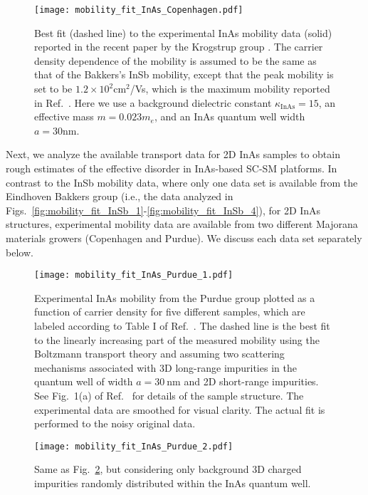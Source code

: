 \documentclass[aps,prmaterials,twocolumn,superscriptaddress,longbibliography]{revtex4-2}
\begin{document}
  \begin{figure}[!htb]
    \centering
    \texttt{[image: mobility\_fit\_InAs\_Copenhagen.pdf]}
    \caption{Best fit (dashed line) to the experimental InAs mobility data (solid) reported in the recent paper by the Krogstrup group \cite{beznasyuk2021role}. The carrier density dependence of the mobility is assumed to be the same as that of the Bakkers's InSb mobility, except that the peak mobility is set to be $1.2\times 10^2$cm$^2$/Vs, which is the maximum mobility reported in Ref.~. Here we use a background dielectric constant $\kappa_\mathrm{InAs}=15$, an effective mass $m=0.023m_e$, and an InAs quantum well width $a=30$nm.}
    \label{fig:mobility_fit_InAs_Copenhagen}
  \end{figure}  

Next, we analyze the available transport data for 2D InAs samples to obtain rough estimates of the effective disorder in  InAs-based  SC-SM platforms.  In contrast to the InSb mobility data, where only one data set is available from the Eindhoven Bakkers group (i.e., the data analyzed in Figs.~\ref{fig:mobility_fit_InSb_1}-\ref{fig:mobility_fit_InSb_4}), for 2D InAs structures, experimental mobility data are available from two different Majorana materials growers (Copenhagen and Purdue).  We discuss each data set separately below.
  
 \begin{figure*}[!htb]
    \centering
    \texttt{[image: mobility\_fit\_InAs\_Purdue\_1.pdf]}
    \caption{Experimental InAs mobility from the Purdue group \cite{pauka2020repairing} plotted as a function of carrier density for five different samples, which are labeled according to Table I of Ref.~. The dashed line is the best fit to the linearly increasing part of the measured mobility using the Boltzmann transport theory and assuming two scattering mechanisms associated with 3D long-range impurities in the quantum well of width $a=30~\mathrm{nm}$ and 2D short-range impurities. See Fig.~1(a) of Ref.~ for details of the sample structure. The experimental data are smoothed for visual clarity. The actual fit is performed to the noisy original data.}
    \label{fig:mobility_fit_InAs_Purdue_1}
  \end{figure*}
  
  \begin{figure*}[!htb]
    \centering
    \texttt{[image: mobility\_fit\_InAs\_Purdue\_2.pdf]}
    \caption{Same as Fig.~\ref{fig:mobility_fit_InAs_Purdue_1}, but  considering only background 3D charged impurities randomly distributed within the InAs quantum well. }
    \label{fig:mobility_fit_InAs_Purdue_2}
  \end{figure*}
    
\end{document}
